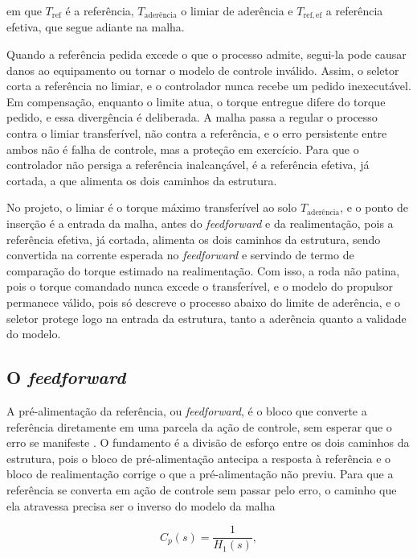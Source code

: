 em que $T_{\mathrm{ref}}$ é a referência, $T_{\text{ader\^{e}ncia}}$ o limiar de
aderência e $T_{\mathrm{ref,ef}}$ a referência efetiva, que segue adiante na malha.

Quando a referência pedida excede o que o processo admite, segui-la pode causar danos ao
equipamento ou tornar o modelo de controle inválido. Assim, o seletor corta a referência no
limiar, e o controlador nunca recebe um pedido inexecutável. Em compensação, enquanto o
limite atua, o torque entregue difere do torque pedido, e essa divergência é deliberada. A
malha passa a regular o processo contra o limiar transferível, não contra a referência, e o
erro persistente entre ambos não é falha de controle, mas a proteção em exercício. Para que
o controlador não persiga a referência inalcançável, é a referência efetiva, já cortada, a
que alimenta os dois caminhos da estrutura.

No projeto, o limiar é o torque máximo transferível ao solo $T_{\text{ader\^{e}ncia}}$, e o
ponto de inserção é a entrada da malha, antes do \emph{feedforward} e da realimentação, pois a
referência efetiva, já cortada, alimenta os dois caminhos da estrutura, sendo
convertida na corrente esperada no \emph{feedforward} e servindo de termo de comparação do
torque estimado na realimentação. Com isso, a roda não patina, pois o torque comandado
nunca excede o transferível, e o modelo do propulsor permanece válido, pois só descreve o
processo abaixo do limite de aderência, e o seletor protege logo na entrada da
estrutura, tanto a aderência quanto a validade do modelo.

\subsection{O \emph{feedforward}}
\label{sec:feedforward}

A pré-alimentação da referência, ou \emph{feedforward}, é o bloco que converte a
referência diretamente em uma parcela da ação de controle, sem esperar que o erro se
manifeste \cite{raffo_tcpi_psrprp}. O fundamento é a divisão de esforço entre os dois
caminhos da estrutura, pois o bloco de pré-alimentação antecipa a
resposta à referência e o bloco de realimentação corrige o que a pré-alimentação não
previu. Para que a referência se converta em ação de controle sem passar pelo erro, o
caminho que ela atravessa precisa ser o inverso do modelo da malha

\begin{equation}\label{eq:controlador_ideal}
C_p(s) = \frac{1}{H_1(s)},
\end{equation}

